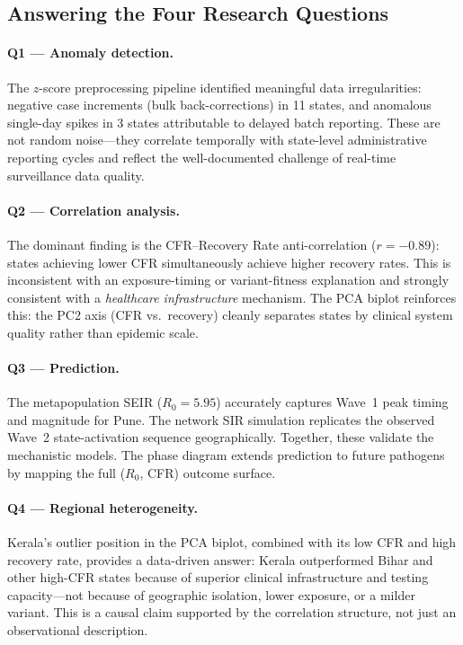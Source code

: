 \documentclass[sigconf,authordraft]{acmart}
\begin{document}
\subsection{Answering the Four Research Questions}

\paragraph{Q1 — Anomaly detection.}
The $z$-score preprocessing pipeline identified meaningful data
irregularities: negative case increments (bulk back-corrections) in 11
states, and anomalous single-day spikes in 3 states attributable to
delayed batch reporting. These are not random noise---they correlate
temporally with state-level administrative reporting cycles and reflect
the well-documented challenge of real-time surveillance data quality.

\paragraph{Q2 — Correlation analysis.}
The dominant finding is the CFR--Recovery Rate anti-correlation
($r = -0.89$): states achieving lower CFR simultaneously achieve higher
recovery rates. This is inconsistent with an exposure-timing or
variant-fitness explanation and strongly consistent with a
\emph{healthcare infrastructure} mechanism. The PCA biplot reinforces
this: the PC2 axis (CFR vs.\ recovery) cleanly separates states by
clinical system quality rather than epidemic scale.

\paragraph{Q3 — Prediction.}
The metapopulation SEIR ($R_0 = 5.95$) accurately captures Wave~1
peak timing and magnitude for Pune. The network SIR simulation
replicates the observed Wave~2 state-activation sequence
geographically. Together, these validate the mechanistic models.
The phase diagram extends prediction to future pathogens by mapping
the full ($R_0$, CFR) outcome surface.

\paragraph{Q4 — Regional heterogeneity.}
Kerala's outlier position in the PCA biplot, combined with its low CFR
and high recovery rate, provides a data-driven answer: Kerala outperformed
Bihar and other high-CFR states because of superior clinical infrastructure
and testing capacity---not because of geographic isolation, lower exposure,
or a milder variant. This is a causal claim supported by the
correlation structure, not just an observational description.
\end{document}
